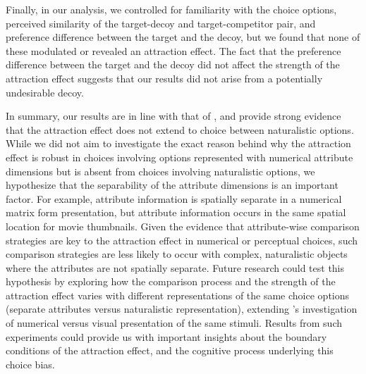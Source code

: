\documentclass[12pt, a4paper]{article}
\begin{document}
Finally, in our analysis, we controlled for familiarity with the choice options, perceived similarity of the target-decoy and target-competitor pair, and preference difference between the target and the decoy, but we found that none of these modulated or revealed an attraction effect. The fact that the preference difference between the target and the decoy did not affect the strength of the attraction effect suggests that our results did not arise from a potentially undesirable decoy. 


In summary, our results are in line with that of , and provide strong evidence that the attraction effect does not extend to choice between naturalistic options. While we did not aim to investigate the exact reason behind why the attraction effect is robust in choices involving options represented with numerical attribute dimensions but is absent from choices involving naturalistic options, we hypothesize that the separability of the attribute dimensions is an important factor. For example, attribute information is spatially separate in a numerical matrix form presentation, but attribute information occurs in the same spatial location for movie thumbnails. Given the evidence that attribute-wise comparison strategies are key to the attraction effect in numerical or perceptual choices, such comparison strategies are less likely to occur with complex, naturalistic objects where the attributes are not spatially separate. Future research could test this hypothesis by exploring how the comparison process and the strength of the attraction effect varies with different representations of the same choice options (separate attributes versus naturalistic representation), extending \citeauthor{Frederick2014}'s investigation of numerical versus visual presentation of the same stimuli. Results from such experiments could provide us with important insights about the boundary conditions of the attraction effect, and the cognitive process underlying this choice bias.









\newpage


\end{document}
